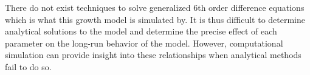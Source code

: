 There do not exist techniques to solve generalized 6th order difference equations which is what this growth model is simulated by. It is thus difficult to determine analytical solutions to the model and determine the precise effect of each parameter on the long-run behavior of the model. However, computational simulation can provide insight into these relationships when analytical methods fail to do so. 










